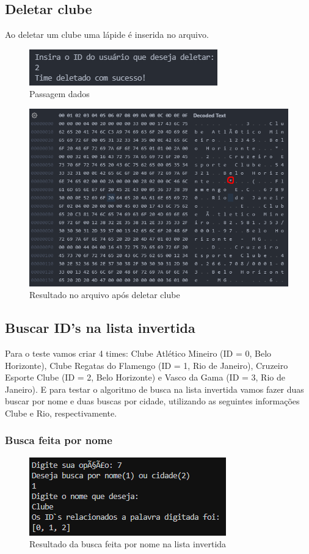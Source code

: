\documentclass[12pt]{article}
\begin{document}
\subsection{Deletar clube}
Ao deletar um clube uma lápide é inserida no arquivo.

\begin{figure}[ht]
\centering
\includegraphics[width=.7\textwidth]{delete.png}
\caption{Passagem dados}
\label{fig:att_arq}
\end{figure}

\begin{figure}[ht]
\centering
\includegraphics[width=.5\textwidth]{delete_result.png}
\caption{Resultado no arquivo após deletar clube}
\label{fig:att_arq}
\end{figure}

\subsection{Buscar ID's na lista invertida}
Para o teste vamos criar 4 times: Clube Atlético Mineiro (ID = 0, Belo Horizonte), Clube Regatas do Flamengo (ID = 1, Rio de Janeiro), Cruzeiro Esporte Clube (ID = 2, Belo Horizonte) e Vasco da Gama (ID = 3, Rio de Janeiro). E para testar o algoritmo de busca na lista invertida vamos fazer duas buscar por nome e duas buscas por cidade, utilizando as seguintes informações Clube e Rio, respectivamente.

\newpage
\subsubsection{Busca feita por nome}

\begin{figure}[ht]
\centering
\includegraphics[width=.6\textwidth]{busca_nome.png}
\caption{Resultado da busca feita por nome na lista invertida}
\label{fig:att_arq}
\end{figure}
\end{document}

